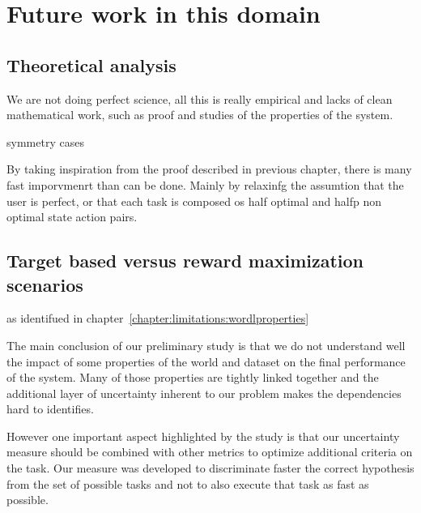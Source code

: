 \section{Future work in this domain}




\subsection{Theoretical analysis}

We are not doing perfect science, all this is really empirical and lacks of clean mathematical work, such as proof and studies of the properties of the system. 

symmetry cases

By taking inspiration from the proof described in previous chapter, there is many fast imporvmenrt than can be done. Mainly by relaxinfg the assumtion that the user is perfect, or that each task is composed os half optimal and halfp non optimal state action pairs.


\subsection{Target based versus reward maximization scenarios}

as identifued in chapter~\ref{chapter:limitations:wordlproperties}

The main conclusion of our preliminary study is that we do not understand well the impact of some properties of the world and dataset on the final performance of the system. Many of those properties are tightly linked together and the additional layer of uncertainty inherent to our problem makes the dependencies hard to identifies.

However one important aspect highlighted by the study is that our uncertainty measure should be combined with other metrics to optimize additional criteria on the task. Our measure was developed to discriminate faster the correct hypothesis from the set of possible tasks and not to also execute that task as fast as possible.


